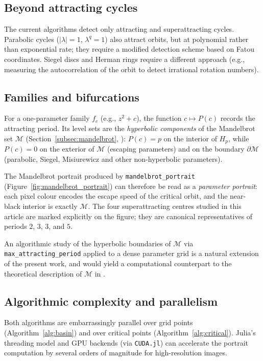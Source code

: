 \documentclass[12pt]{article}
\theoremstyle{definition}
\begin{document}
\subsection{Beyond attracting cycles}

The current algorithms detect only attracting and superattracting cycles.
Parabolic cycles ($|\lambda|=1$, $\lambda^q=1$) also attract orbits, but
at polynomial rather than exponential rate; they require a modified
detection scheme based on Fatou coordinates.  Siegel discs and Herman
rings require a different approach (e.g., measuring the autocorrelation
of the orbit to detect irrational rotation numbers).

\subsection{Families and bifurcations}

For a one-parameter family $f_c$ (e.g., $z^2+c$),
the function $c\mapsto P(c)$ records the attracting period.  Its level
sets are the \emph{hyperbolic components} of the Mandelbrot set
$\mathcal{M}$ (Section~\ref{subsec:mandelbrot}, \cite{DouadyHubbard1985}):
$P(c)=p$ on the interior of $H_p$, while $P(c)=0$ on the exterior
of $\mathcal{M}$ (escaping parameters) and on the boundary
$\partial\mathcal{M}$ (parabolic, Siegel, Misiurewicz and other
non-hyperbolic parameters).

The Mandelbrot portrait produced by \texttt{mandelbrot\_portrait}
(Figure~\ref{fig:mandelbrot_portrait}) can therefore be read as a
\emph{parameter portrait}: each pixel colour encodes the escape speed
of the critical orbit, and the near-black interior is exactly
$\mathcal{M}$.  The four superattracting centres studied in this article
are marked explicitly on the figure; they are canonical representatives
of periods $2$, $3$, $3$, and $5$.

An algorithmic study of the hyperbolic boundaries of $\mathcal{M}$ via
\texttt{max\_attracting\_period} applied to a dense parameter grid is
a natural extension of the present work, and would yield a computational
counterpart to the theoretical description of $\mathcal{M}$ in
\cite{DouadyHubbard1985}.

\subsection{Algorithmic complexity and parallelism}

Both algorithms are embarrassingly parallel over grid points
(Algorithm~\ref{alg:basin}) and over critical points
(Algorithm~\ref{alg:critical}).  Julia's threading model and
GPU backends (via \texttt{CUDA.jl}) can accelerate the portrait
computation by several orders of magnitude for high-resolution images.
\end{document}
